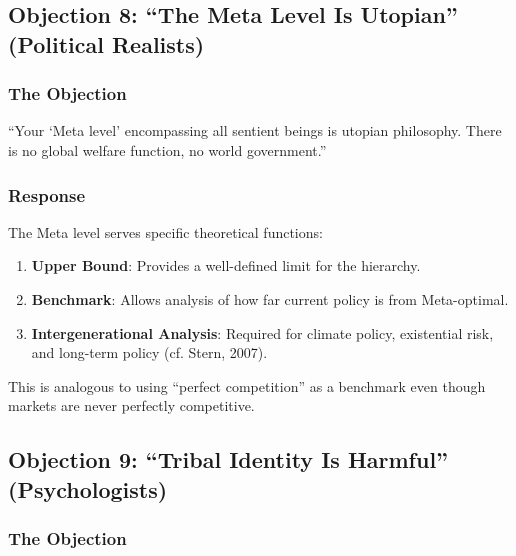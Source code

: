 \subsection{Objection 8: ``The Meta Level Is Utopian'' (Political Realists)}

\subsubsection{The Objection}

\begin{tcolorbox}[colback=red!5!white, colframe=red!75!black, title=Realist's Objection]
``Your `Meta level' encompassing all sentient beings is utopian philosophy. 
There is no global welfare function, no world government.''
\end{tcolorbox}

\subsubsection{Response}

The Meta level serves specific theoretical functions:

\begin{enumerate}
\item \textbf{Upper Bound}: Provides a well-defined limit for the hierarchy.
\item \textbf{Benchmark}: Allows analysis of how far current policy is from 
Meta-optimal.
\item \textbf{Intergenerational Analysis}: Required for climate policy, 
existential risk, and long-term policy (cf. Stern, 2007).
\end{enumerate}

This is analogous to using ``perfect competition'' as a benchmark even though 
markets are never perfectly competitive.

\subsection{Objection 9: ``Tribal Identity Is Harmful'' (Psychologists)}

\subsubsection{The Objection}

